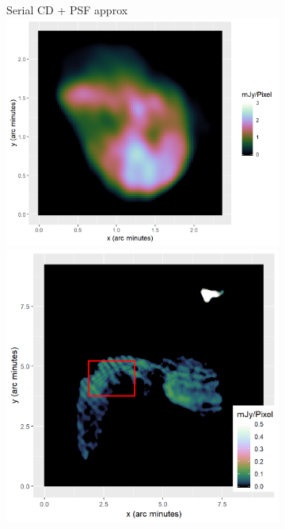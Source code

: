 \begin{figure}[h]
	\centering
	\begin{subfigure}{0.3\linewidth}
		\centering
		Serial CD + PSF approx
		\includegraphics[width=1.0\linewidth]{./chapters/10.results/pcdm/SerialCD-N132.png}
		\\
		\includegraphics[width=1.0\linewidth]{./chapters/10.results/pcdm/SerialCD-Calibration-rec.png}

\end{subfigure}
\end{figure}
